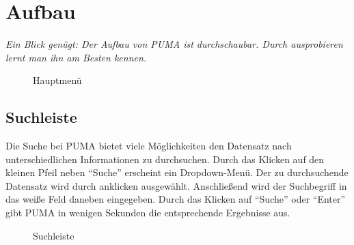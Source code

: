\section{Aufbau}
\textit{Ein Blick genügt: Der Aufbau von PUMA ist durchschaubar. Durch ausprobieren lernt man ihn am Besten kennen.}
\begin{figure}[h!]
 \centering
 \caption{Hauptmenü}
 \label{figure3}
\end{figure} 
\subsection{Suchleiste}
Die Suche bei PUMA bietet viele Möglichkeiten den Datensatz nach unterschiedlichen Informationen zu durchsuchen. Durch das Klicken auf den kleinen Pfeil neben \enquote{Suche} erscheint ein Dropdown-Menü.  Der zu durchsuchende Datensatz wird durch anklicken ausgewählt. Anschließend wird der Suchbegriff in das weiße Feld daneben eingegeben. Durch das Klicken auf \enquote{Suche} oder \enquote{Enter} gibt PUMA in wenigen Sekunden die entsprechende Ergebnisse aus.

\begin{figure}[h!]
 \centering
 \caption{Suchleiste}
 \label{figure3}
\end{figure}  

